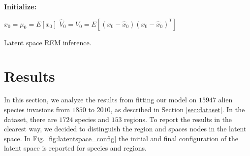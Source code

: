 \documentclass[mscthesis]{usiinfthesis}
\begin{document}
\begin{algorithm}[H]

\textbf{Initialize: }
\begin{substeps}
$\hat{x}_0 = \mu_0 = E[x_0]$ \;
$\hat{V}_0 = V_0 = E[(x_0-\hat{x}_0)(x_0-\hat{x}_0)^T]$  \;
\end{substeps}
\caption{Latent space REM inference.}
\label{algo:rem_latent}
\end{algorithm}



%

\chapter{Results}

In this section, we analyze the results from fitting our model on $15947$ alien species invasions from $1850$ to $2010$, as described in Section \ref{sec:dataset}. In the dataset, there are $1724$ species and $153$ regions. To report the results in the clearest way, we decided to distinguish the region and spaces nodes in the latent space. In Fig. \ref{fig:latentspace_config} the initial and final configuration of the latent space is reported for species and regions. 
\end{document}
